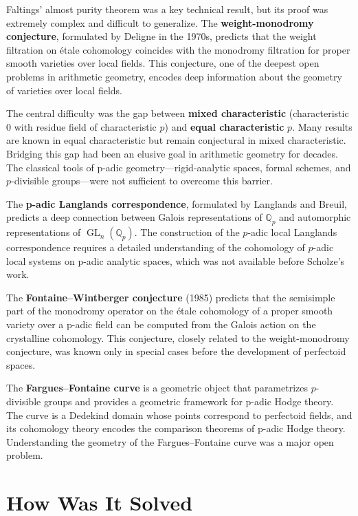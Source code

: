 Faltings' almost purity theorem was a key technical result, but its proof was extremely complex and difficult to generalize. The \textbf{weight-monodromy conjecture}, formulated by Deligne in the 1970s, predicts that the weight filtration on \'{e}tale cohomology coincides with the monodromy filtration for proper smooth varieties over local fields. This conjecture, one of the deepest open problems in arithmetic geometry, encodes deep information about the geometry of varieties over local fields.

The central difficulty was the gap between \textbf{mixed characteristic} (characteristic 0 with residue field of characteristic $p$) and \textbf{equal characteristic} $p$. Many results are known in equal characteristic but remain conjectural in mixed characteristic. Bridging this gap had been an elusive goal in arithmetic geometry for decades. The classical tools of p-adic geometry---rigid-analytic spaces, formal schemes, and $p$-divisible groups---were not sufficient to overcome this barrier.

The \textbf{p-adic Langlands correspondence}, formulated by Langlands and Breuil, predicts a deep connection between Galois representations of $\mathbb{Q}_p$ and automorphic representations of $\operatorname{GL}_n(\mathbb{Q}_p)$. The construction of the $p$-adic local Langlands correspondence requires a detailed understanding of the cohomology of $p$-adic local systems on p-adic analytic spaces, which was not available before Scholze's work.

The \textbf{Fontaine--Wintberger conjecture} (1985) predicts that the semisimple part of the monodromy operator on the \'{e}tale cohomology of a proper smooth variety over a p-adic field can be computed from the Galois action on the crystalline cohomology. This conjecture, closely related to the weight-monodromy conjecture, was known only in special cases before the development of perfectoid spaces.

The \textbf{Fargues--Fontaine curve} is a geometric object that parametrizes $p$-divisible groups and provides a geometric framework for p-adic Hodge theory. The curve is a Dedekind domain whose points correspond to perfectoid fields, and its cohomology theory encodes the comparison theorems of p-adic Hodge theory. Understanding the geometry of the Fargues--Fontaine curve was a major open problem.

\section{How Was It Solved}

